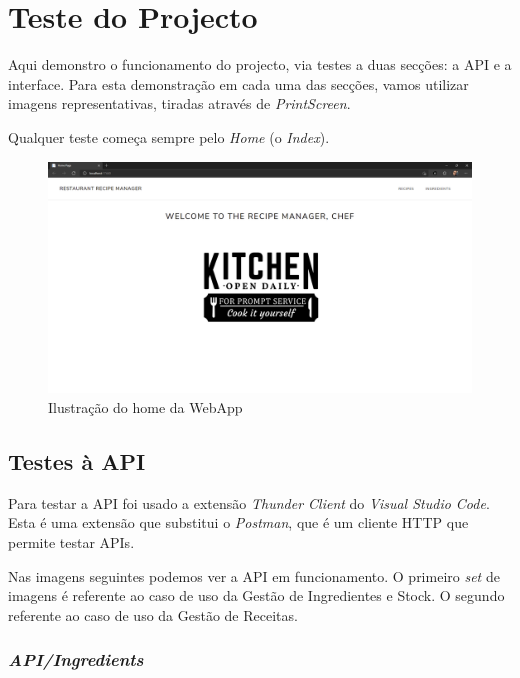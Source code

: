 \chapter{Teste do Projecto}

Aqui demonstro o funcionamento do projecto, via testes a duas secções: a API e a interface. Para esta demonstração em cada uma das secções, vamos utilizar imagens representativas, tiradas através de \textit{PrintScreen}.

Qualquer teste começa sempre pelo \textit{Home} (o \textit{Index}).

\begin{figure}[!hbt]
    \centering
    \includegraphics[width=14cm]{Resources/WebApp/Home/home.png}
    \caption{Ilustração do home da WebApp}
    \label{fig:home}
\end{figure}
\FloatBarrier

\section{Testes à API}

Para testar a API foi usado a extensão \textit{Thunder Client} do \textit{Visual Studio Code}. Esta é uma extensão que substitui o \textit{Postman}, que é um cliente HTTP que permite testar APIs.

Nas imagens seguintes podemos ver a API em funcionamento. O primeiro \textit{set} de imagens é referente ao caso de uso da Gestão de Ingredientes e Stock. O segundo referente ao caso de uso da Gestão de Receitas.

\newpage
\subsection{\textit{API/Ingredients}}

